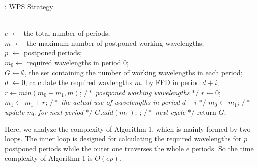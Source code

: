 \documentclass[letter]{IEEEtran}
\begin{document}
\renewcommand{\algorithmicrequire}{ \textbf{Initialize:}}
\begin{algorithm}[h]
    \scriptsize
    \caption{: WPS Strategy}
    \begin{algorithmic}[1]
        \REQUIRE ~~\\
        $ e $ $ \leftarrow $ the total number of periods;\\
        $ m $ $ \leftarrow $ the maximum number of postponed working wavelengths;\\
        $ p $ $ \leftarrow $ postponed periods; \\
        $ m_{0} \leftarrow$ required wavelengths in period 0;\\
        $ G \leftarrow \emptyset$, the set containing the number of working wavelengths in each period;\\
        $ d $ $ \leftarrow 0 $; 
                \STATE calculate the required wavlengths $ m_{1} $ by FFD in period $ d + i $;\\
                    \STATE $ r \leftarrow min(m_{0} - m_{1}, m) $; $/*$ \textit{postponed working wavelengths} $*/$
                \ELSE
                    \STATE $ r \leftarrow 0 $;
                \ENDIF
                \STATE $ m_{1} \leftarrow m_{1} + r$; $/*$ \textit{the actual use of wavelengths in period} $d+i$ $*/$
                \STATE $ m_{0} \leftarrow m_{1}$;  $/*$ \textit{update $ m_{0} $ for next period} $*/$ 
                \STATE $G.add(m_{1})$;
        \ENDFOR
        ; $/*$ \textit{next cycle} $*/$
        \ENDWHILE
        \STATE return $G$;
    \end{algorithmic}
\end{algorithm}
\vspace{-2.0mm}
Here, we analyze the complexity of Algorithm 1, which is mainly formed by two loops. The inner loop is designed for calculating the required wavelengths for $p$ postponed periods while the outer one traverses the whole $e$ periods. So the time complexity of Algorithm 1 is $O(ep)$.
\end{document}
